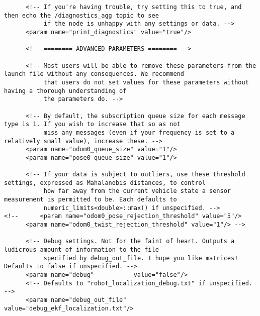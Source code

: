 \begin{verbatim}
      <!-- If you're having trouble, try setting this to true, and then echo the /diagnostics_agg topic to see
           if the node is unhappy with any settings or data. -->
      <param name="print_diagnostics" value="true"/>

      <!-- ======== ADVANCED PARAMETERS ======== -->

      <!-- Most users will be able to remove these parameters from the launch file without any consequences. We recommend
           that users do not set values for these parameters without having a thorough understanding of
           the parameters do. -->

      <!-- By default, the subscription queue size for each message type is 1. If you wish to increase that so as not
           miss any messages (even if your frequency is set to a relatively small value), increase these. -->
      <param name="odom0_queue_size" value="1"/>
      <param name="pose0_queue_size" value="1"/>

      <!-- If your data is subject to outliers, use these threshold settings, expressed as Mahalanobis distances, to control
           how far away from the current vehicle state a sensor measurement is permitted to be. Each defaults to
           numeric_limits<double>::max() if unspecified. -->
<!--      <param name="odom0_pose_rejection_threshold" value="5"/>
      <param name="odom0_twist_rejection_threshold" value="1"/> -->

      <!-- Debug settings. Not for the faint of heart. Outputs a ludicrous amount of information to the file
           specified by debug_out_file. I hope you like matrices! Defaults to false if unspecified. -->
      <param name="debug"           value="false"/>
      <!-- Defaults to "robot_localization_debug.txt" if unspecified. -->
      <param name="debug_out_file"  value="debug_ekf_localization.txt"/>


\end{verbatim}
